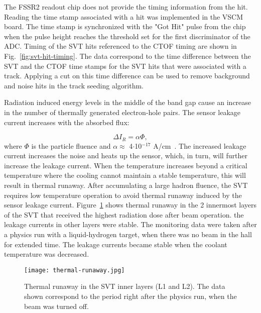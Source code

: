 The FSSR2 readout chip does not provide the timing information from the hit. Reading the time stamp associated with a hit was implemented in the VSCM board. The time stamp is synchronized with the "Got Hit" pulse from the chip when the pulse height reaches the threshold set for the first discriminator of the ADC. Timing of the SVT hits referenced to the CTOF timing are shown in Fig.~\ref{fig:svt-hit-timing}. The data correspond to the time difference between the SVT and the CTOF time stamps for the SVT hits that were associated with a track. Applying a cut on this time difference can be  used to remove background and noise hits in the track seeding algorithm.

Radiation induced energy levels in the middle of the band gap cause an increase in the number of thermally generated electron-hole pairs. The sensor leakage current increases with the absorbed flux:

\begin{equation} \Delta I_R = \alpha \Phi \label{eq:leakage-fluence},
\end{equation}
where $\Phi$ is the particle fluence and $\alpha \approx$ 4$\cdot$10$^{-17}$ A/cm~\cite{DIERLAMMTHESIS}. The increased leakage current increases the noise and heats up the sensor, which, in turn, will further increase the leakage current. When the temperature increases beyond a critical temperature where the cooling cannot maintain a stable temperature, this will result in thermal runaway. After accumulating a large hadron fluence, the SVT requires low temperature operation to avoid thermal runaway induced by the sensor leakage current. Figure~\ref{fig:thermal-runaway} shows thermal runaway in the 2 innermost layers of the SVT that received the highest radiation dose after beam operation. the leakage currents in other layers were stable. The monitoring data were taken after a physics run with a liquid-hydrogen target, when there was no beam in the hall for extended time. The leakage currents became stable when the coolant temperature was decreased.

\begin{figure}[hbt] 
\centering 
\texttt{[image: thermal-runaway.jpg]}
\caption{Thermal runaway in the SVT inner layers (L1 and L2). The data shown correspond to the period right after the physics run, when the beam was turned off.}
\label{fig:thermal-runaway}
\end{figure}


